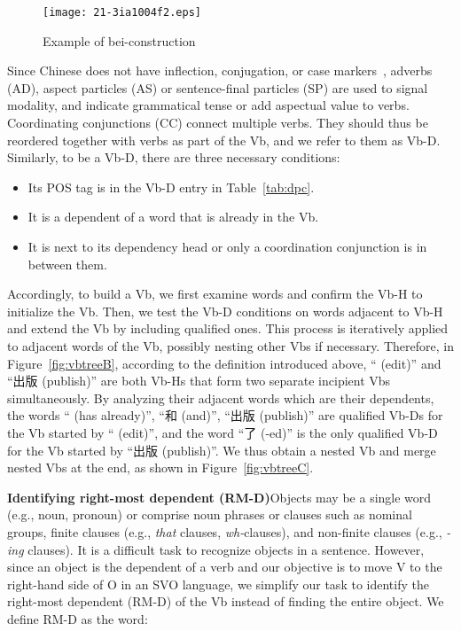 \documentclass[english]{jnlp_1.4}
\begin{document}
\begin{figure}[t]
\begin{center}
\texttt{[image: 21-3ia1004f2.eps]}
\end{center}
\caption{Example of bei-construction}
\label{fig:bei}
\end{figure}

Since Chinese does not have inflection, conjugation, or case markers~\cite{Li1989},
adverbs (AD), aspect particles (AS) or sentence-final particles (SP) are used 
to signal modality, and indicate grammatical tense or add aspectual value to verbs.
Coordinating conjunctions (CC) connect multiple verbs. They should thus be 
reordered together with verbs as part of the Vb, and we refer to them as Vb-D. 
Similarly, to be a Vb-D, there are three necessary conditions:

\begin{itemize}
\item Its POS tag is in the Vb-D entry in Table~\ref{tab:dpc}. 
\item It is a dependent of a word that is already in the Vb. 
\item It is next to its dependency head or only a coordination conjunction is in between them.
\end{itemize}

Accordingly, to build a Vb, we first examine words and confirm 
the Vb-H to initialize the Vb. Then, we test the Vb-D conditions on words adjacent 
to Vb-H and extend the Vb by including qualified ones. This process is iteratively 
applied to adjacent words of the Vb, possibly nesting other Vbs if necessary. 
Therefore, in Figure~\ref{fig:vbtreeB}, according to the definition introduced 
above, `` (edit)'' and ``出版 (publish)'' are both Vb-Hs that form two separate 
incipient Vbs simultaneously. By analyzing their adjacent words which are their 
dependents, the words `` (has already)'', ``和 (and)'', ``出版 (publish)'' are 
qualified Vb-Ds for the Vb started by `` (edit)'', and the word ``了 (-ed)'' 
is the only qualified Vb-D for the Vb started by ``出版 (publish)''. We thus 
obtain a nested Vb and merge nested Vbs at the end, as shown in Figure~\ref{fig:vbtreeC}. 

{\bf Identifying right-most dependent (RM-D)}\quad Objects may be a single word 
(e.g., noun, pronoun) or comprise noun phrases or clauses \cite{Downing2006} 
such as nominal groups, finite clauses (e.g., \emph{that} clauses, \emph{wh-}clauses), 
and non-finite clauses (e.g., \emph{-ing} clauses). It is a difficult task to recognize
objects in a sentence. However, since an object is the dependent of a verb and our objective 
is to move V to the right-hand side of O in an SVO language, we simplify our task 
to identify the right-most dependent (RM-D) of the Vb instead of finding the entire object.
We define RM-D as the word:
\end{document}
